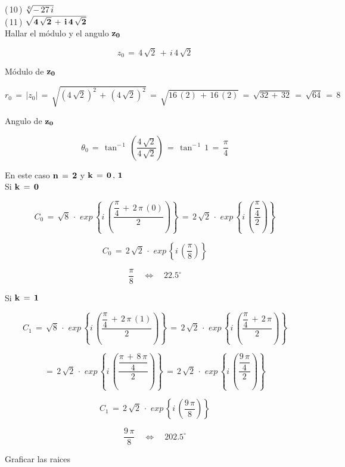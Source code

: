 \documentclass[a4paper,11pt,openany]{book}
\begin{document}
\textcolor{ao(english)}{(\,10\,)} $\bf{\sqrt[6]{-\,27\,i}}$\\

\textcolor{ao(english)}{(\,11\,)} $\bf{\sqrt{4\,\sqrt{2}\,+\,i\,4\,\sqrt{2}}}$\\

\textcolor{ao(english)}{} Hallar el módulo y el angulo $\bf{z_{0}}$

$$z_{0}\,=\,4\,\sqrt{2}\,+\,i\,4\,\sqrt{2}$$

\textcolor{ao(english)}{} Módulo de $\bf{z_{0}}$

$$r_{0}\,=\,|z_{0}|\,=\,\sqrt{\left(4\,\sqrt{2}\right)^{2}\,+\,\left(4\,\sqrt{2}\right)^{2}}\,=\,\sqrt{16\,(2)\,+\,16\,(2)}\,=\,\sqrt{32\,+\,32}\,=\,\sqrt{64}\,=\,8$$

\textcolor{ao(english)}{} Angulo de $\bf{z_{0}}$

$$\theta_{0}\,=\,\tan^{-\,1}\,\left(\dfrac{4\,\sqrt{2}}{4\,\sqrt{2}}\right)\,=\,\tan^{-\,1}\,1\,=\,\dfrac{\pi}{4}$$

\textcolor{ao(english)}{} En este caso $\bf{n\,=\,2}$ y $\bf{k\,=\,0\,,\,1}$\\

\textcolor{ao(english)}{} Si $\bf{k\,=\,0}$

$$C_{0}\,=\,\sqrt{8}\,\cdot\,\,exp\,\left\{i\,\left(\dfrac{\dfrac{\pi}{4}\,+\,2\,\pi\,(0)}{2}\right)\right\}\,=\,2\,\sqrt{2}\,\cdot\,\,exp\,\left\{i\,\left(\dfrac{\dfrac{\pi}{4}}{2}\right)\right\}$$

$$C_{0}\,=\,2\,\sqrt{2}\,\cdot\,\,exp\,\left\{i\,\left(\dfrac{\pi}{8}\right)\right\}$$

$$\dfrac{\pi}{8} \quad\iff\quad 22.5^\circ$$

\textcolor{ao(english)}{} Si $\bf{k\,=\,1}$

$$C_{1}\,=\,\sqrt{8}\,\cdot\,\,exp\,\left\{i\,\left(\dfrac{\dfrac{\pi}{4}\,+\,2\,\pi\,(1)}{2}\right)\right\}\,=\,2\,\sqrt{2}\,\cdot\,\,exp\,\left\{i\,\left(\dfrac{\dfrac{\pi}{4}\,+\,2\,\pi}{2}\right)\right\}$$

$$=\,2\,\sqrt{2}\,\cdot\,\,exp\,\left\{i\,\left(\dfrac{\dfrac{\pi\,+\,8\,\pi}{4}}{2}\right)\right\}\,=\,2\,\sqrt{2}\,\cdot\,\,exp\,\left\{i\,\left(\dfrac{\dfrac{9\,\pi}{4}}{2}\right)\right\}$$

$$C_{1}\,=\,2\,\sqrt{2}\,\cdot\,\,exp\,\left\{i\,\left(\dfrac{9\,\pi}{8}\right)\right\}$$

$$\dfrac{9\,\pi}{8} \quad\iff\quad 202.5^\circ$$

\textcolor{ao(english)}{} Graficar las raices
\end{document}
